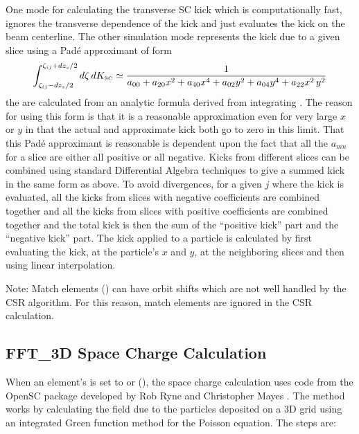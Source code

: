 One mode for calculating the transverse SC kick which is computationally fast, ignores the
transverse dependence of the kick and just evaluates the kick on the beam centerline. The other
simulation mode represents the kick due to a given slice using a Pad{\'e} approximant of form
\begin{equation}
  \int_{\zeta_{ij}-dz_s/2}^{\zeta_{ij}+dz_s/2} d\zeta \, dK_{\mbox{\tiny SC}}
  \simeq \frac{1}{a_{00} + a_{20} x^2 + a_{40} x^4 + a_{02} y^2 + a_{04} y^4 + a_{22} x^2 \, y^2}
\end{equation}
the  are calculated from an analytic formula derived from integrating . The
reason for using this form is that it is a reasonable approximation even for very large $x$ or $y$
in that the actual and approximate kick both go to zero in this limit. That this Pad{\'e}
approximant is reasonable is dependent upon the fact that all the $a_{mn}$ for a slice are either
all positive or all negative. Kicks from different slices can be combined using standard
Differential Algebra techniques to give a summed kick in the same form as above. To avoid
divergences, for a given $j$ where the kick is evaluated, all the kicks from slices with negative
coefficients are combined together and all the kicks from slices with positive coefficients are
combined together and the total kick is then the sum of the ``positive kick'' part and the
``negative kick'' part. The kick applied to a particle is calculated by first evaluating the kick,
at the particle's $x$ and $y$, at the neighboring slices and then using linear interpolation.

Note: Match elements () can have orbit shifts which are not well handled by the CSR
algorithm. For this reason, match elements are ignored in the CSR calculation.

\subsection{FFT_3D Space Charge Calculation}
\label{s:sc.fft}

When an element's  is set to  or 
(), the space charge calculation uses code from the OpenSC package developed by
Rob Ryne and Christopher Mayes \cite{b:opensc}. The method works by calculating the field due to the
particles deposited on a 3D grid using an integrated Green function method for the Poisson equation. The steps are:

